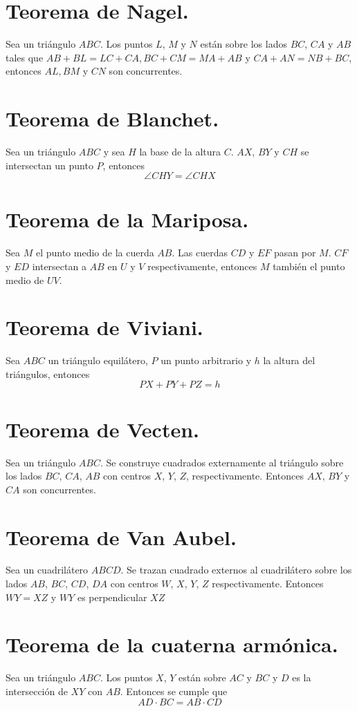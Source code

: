 \documentclass[12pt,a4paper]{book}
\begin{document}
\section{Teorema de Nagel.}
Sea un triángulo $ABC$. Los puntos $L$, $M$ y $N$ están sobre los lados $BC$, $CA$ y $AB$ tales que $AB + BL = LC + CA, BC + CM= MA + AB$ y $CA + AN= NB + BC$, entonces $AL, BM$ y $CN$ son concurrentes.
\section{Teorema de Blanchet.}
Sea un triángulo $ABC$ y sea $H$ la base de la altura $C$. $AX$, $BY$ y $CH$ se intersectan un punto $P$, entonces $$\angle CHY = \angle CHX$$
\section{Teorema de la Mariposa.}
Sea $M$ el punto medio de la cuerda $AB$. Las cuerdas $CD$ y $EF$ pasan por $M$. $CF$ y $ED$ intersectan a $AB$ en $U$ y $V$ respectivamente, entonces $M$ también el punto medio de $UV$.
\section{Teorema de Viviani.}
Sea $ABC$ un triángulo equilátero, $P$ un punto arbitrario y $h$ la altura del triángulos, entonces $$PX + PY +PZ = h$$
\section{Teorema de Vecten.}
Sea un triángulo $ABC$. Se construye cuadrados externamente al triángulo sobre los lados $BC$, $CA$, $AB$ con centros $X$, $Y$, $Z$, respectivamente. Entonces $AX$, $BY$ y $CA$ son concurrentes.
\section{Teorema de Van Aubel.}
Sea un cuadrilátero $ABCD$. Se trazan cuadrado externos al cuadrilátero sobre los lados $AB$, $BC$, $CD$, $DA$ con centros $W$, $X$, $Y$, $Z$ respectivamente. Entonces $WY= XZ$ y $WY$ es perpendicular $XZ$
\section{Teorema de la cuaterna armónica.}
Sea un triángulo $ABC$. Los puntos $X$, $Y$ están sobre ${AC}$ y ${BC}$ y $D$ es la intersección de $XY$ con $AB$. Entonces se cumple que $$AD \cdot BC= AB \cdot CD$$
\end{document}
